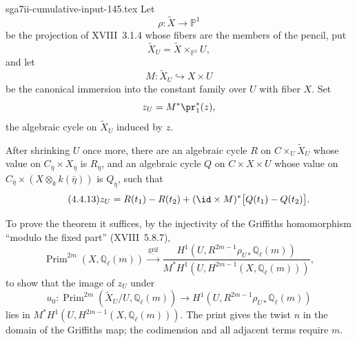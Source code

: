 \begin{filecontents*}{sga7ii-cumulative-input-145.tex}
Let
\begin{equation*}
\rho:\widetilde X\longrightarrow\mathbb P^1
\end{equation*}
be the projection of XVIII~3.1.4 whose fibers are the members of the
pencil, put
\begin{equation*}
\widetilde X_U=\widetilde X\times_{\mathbb P^1}U,
\end{equation*}
and let
\begin{equation*}
M:\widetilde X_U\hookrightarrow X\times U
\end{equation*}
be the canonical immersion into the constant family over $U$ with fiber
$X$.  Set
\begin{equation*}
z_U=M^*\pr_1^*(z),
\end{equation*}
the algebraic cycle on $\widetilde X_U$ induced by $z$.

After shrinking $U$ once more, there are an algebraic cycle $R$ on
$C\times_U\widetilde X_U$ whose value on
$C_{\bar\eta}\times X_{\bar\eta}$ is $R_{\bar\eta}$, and an algebraic
cycle $Q$ on $C\times X\times U$ whose value on
$C_{\bar\eta}\times(X\otimes_k k(\bar\eta))$ is $Q_{\bar\eta}$, such
that
\begin{equation}\tag{4.4.13}
z_U=R(t_1)-R(t_2)
+(\id\times M)^*\bigl[Q(t_1)-Q(t_2)\bigr].
\end{equation}

To prove the theorem it suffices, by the injectivity of the Griffiths
homomorphism ``modulo the fixed part'' (XVIII~5.8.7),
\begin{equation*}
\operatorname{Prim}^{2m}(X,\mathbb Q_\ell(m))
\xrightarrow{\ \underline{\operatorname{grif}}\ }
\frac{H^1(U,R^{2m-1}\rho_{U*}\mathbb Q_\ell(m))}
{M^*H^1(U,H^{2m-1}(X,\mathbb Q_\ell(m)))},
\end{equation*}
to show that the image of $z_U$ under
\begin{equation*}
u_0:\operatorname{Prim}^{2m}(\widetilde X_U/U,\mathbb Q_\ell(m))
\longrightarrow H^1(U,R^{2m-1}\rho_{U*}\mathbb Q_\ell(m))
\end{equation*}
lies in
$M^*H^1(U,H^{2m-1}(X,\mathbb Q_\ell(m)))$.
The print gives the twist $n$ in the domain of the Griffiths map; the
codimension and all adjacent terms require $m$.


\end{filecontents*}
